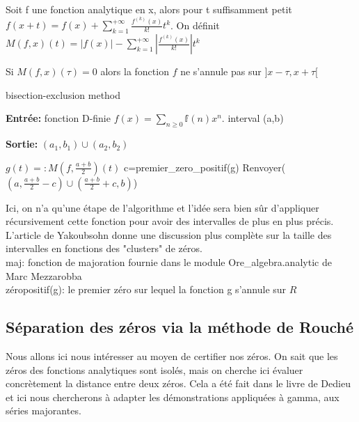 \documentclass[a4paper,10.5pt]{article}
\begin{document}
	\begin{definition}Soit f une fonction analytique en x, alors pour t suffisamment petit\\ $f(x+t)=f(x)+\sum_{k=1}^{+\infty} \frac{f^{(k)}(x)}{k!}t^{k}$. On définit $M(f,x)(t)=|f(x)|-\sum_{k=1}^{+\infty}|\frac{f^{(k)}(x)}{k!}|t^{k}$
	\end{definition}
	
	\begin{proposition} Si $M(f,x)(\tau)=0$ alors la fonction $f$ ne s'annule pas sur $]x-\tau,x+\tau[$ 
	\end{proposition}

	\begin{algorithm}
		\caption{bisection-exclusion method}
		
		\vspace{2mm}
		
		\textbf{Entrée:} fonction D-finie $f(x)=\sum_{n \geq 0} \mathbb{f}(n)x^{n}$. interval (a,b)
		
		\textbf{Sortie:} $(a_{1},b_{1})\cup (a_{2},b_{2})$
		
		\begin{algorithmic}[1]
			
			\STATE $g(t)=:M(f,\frac{a+b}{2})(t)$
			\STATE c=premier\_zero\_positif(g)
			\STATE Renvoyer($(a,\frac{a+b}{2}-c)\cup (\frac{a+b}{2}+c,b)$)
		\end{algorithmic}
		
	\end{algorithm}
	
	\noindent Ici, on n'a qu'une étape de l'algorithme et l'idée sera bien sûr d'appliquer récursivement cette fonction pour avoir des intervalles de plus en plus précis. L'article de Yakoubsohn donne une discussion plus complète sur la taille des intervalles en fonctions des "clusters" de zéros.\\
	\noindent maj: fonction de majoration fournie dans le module Ore\_algebra.analytic de Marc Mezzarobba\\
	zéropositif(g): le premier zéro sur lequel la fonction g s'annule sur ${R}$
	\\
	

	
	\subsection{Séparation des zéros via la méthode de Rouché}
	Nous allons ici nous intéresser au moyen de certifier nos zéros. On sait que les zéros des fonctions analytiques sont isolés, mais on cherche ici évaluer concrètement la distance entre deux zéros. Cela a été fait dans le livre de Dedieu et ici nous chercherons à adapter les démonstrations appliquées à gamma, aux séries majorantes.
	
\end{document}

